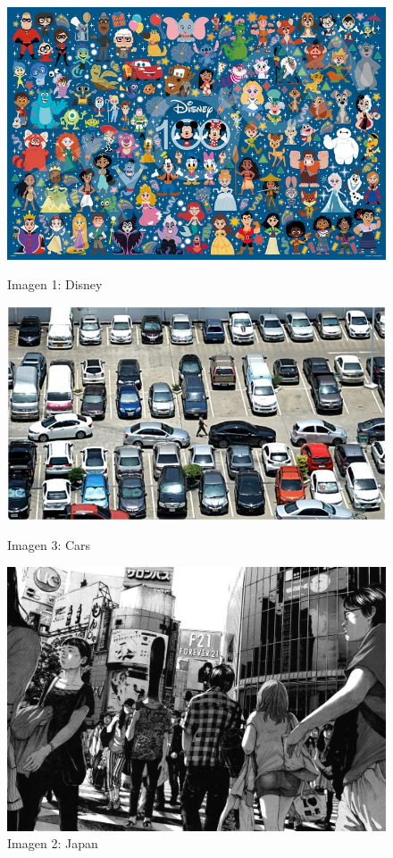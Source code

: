 \begin{figure}[ht]
	\centering
	\begin{minipage}[b]{0.3\textwidth}
		\centering
		\includegraphics[width=\textwidth]{Graphics/disney.jpeg}
		\caption*{Imagen 1: Disney}
	\end{minipage}
	\hfill
	\begin{minipage}[b]{0.3\textwidth}
		\centering
		\includegraphics[width=\textwidth]{Graphics/cars.jpeg}
		\caption*{Imagen 3: Cars}
	\end{minipage}
	\hfill
		\begin{minipage}[b]{0.3\textwidth}
		\centering
		\includegraphics[width=\textwidth]{Graphics/japan.jpg}
		\caption*{Imagen 2: Japan}
	\end{minipage}
	

\end{figure}
